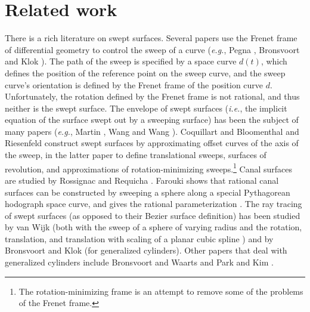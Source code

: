 
\section{Related work}
\label{sec:related}

There is a rich literature on swept surfaces.
Several papers use the Frenet frame of differential geometry
to control the sweep of a curve ({\em e.g.}, Pegna \cite{Pegna88},
Bronsvoort and Klok \cite{bronsklok85}).
The path of the sweep is specified by a space curve $d(t)$,
which defines the position of the reference point on the
sweep curve, and the sweep curve's orientation is defined by
the Frenet frame of the position curve $d$.
Unfortunately, the rotation defined by the Frenet frame is not rational,
and thus neither is the swept surface.  %
The envelope of swept surfaces ({\em i.e.}, the implicit equation of the surface
swept out by a sweeping surface) has been the subject of many papers
({\em e.g.}, Martin \cite{martinsteph90}, Wang and Wang \cite{WangWang86}).
\nocite{Flaquer92}
Coquillart \cite{coquillart87} and Bloomenthal and Riesenfeld 
\cite{bloom91} construct swept surfaces by approximating offset curves
of the axis of the sweep, in the latter paper to define translational sweeps,
surfaces of revolution, and approximations of rotation-minimizing 
sweeps.\footnote{The rotation-minimizing frame 
        is an attempt to remove some of the problems of the Frenet frame.}
Canal surfaces are studied by Rossignac and Requicha 
\cite{rossrequicha84,rossignac85}.
Farouki shows that rational canal surfaces can be constructed by sweeping
a sphere along a special Pythagorean hodograph space curve, and gives the
rational parameterization \cite{farouki94}.
The ray tracing of swept surfaces (as opposed to their Bezier surface 
definition) has been studied by van Wijk (both with the sweep of a sphere
of varying radius \cite{vanwijk84euro} and the rotation, translation,
and translation with scaling of a planar cubic spline \cite{vanwijk84tog})
and by Bronsvoort and Klok \cite{bronsklok85} (for generalized cylinders).
Other papers that deal with generalized cylinders 
include Bronsvoort and Waarts \cite{bronswaart92} and Park and Kim 
\cite{parkkim93}.

